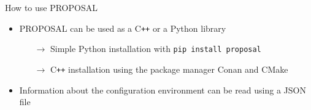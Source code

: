 \documentclass[t]{beamer}
\newlength{\itemseparation}
\begin{document}
  \begin{columns}[onlytextwidth]%
    \begin{column}{0.55\textwidth}%
      \begin{block}[equal height group=F]{How to use PROPOSAL}%
        \begin{itemize}
          \setlength\itemsep{\itemseparation}
          \item PROPOSAL can be used as a C\texttt{++} or a Python library
            \begin{itemize}
              \setlength\itemsep{\itemseparation}
              \item[$\rightarrow$] Simple Python installation with \colorbox{tuYellow}{\texttt{pip install proposal}}
              \item[$\rightarrow$] C\texttt{++} installation using the package manager Conan and CMake
            \end{itemize}
          \item Information about the configuration environment can be read using a JSON file
        \end{itemize}
        \vspace{-0.75em}
        \begin{columns}[onlytextwidth]
        \begin{column}{0.48\textwidth}
        \begin{mdframed}[backgroundcolor=light-gray, roundcorner=10pt,leftmargin=1, rightmargin=1, innerleftmargin=15, innertopmargin=15,innerbottommargin=15, outerlinewidth=1, linecolor=light-gray]

          
          \end{mdframed} 


\end{column}
\end{columns}
\end{block}
\end{column}
\end{columns}
\end{document}
